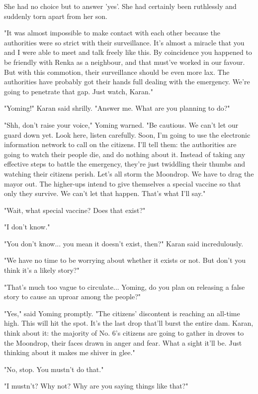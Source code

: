 She had no choice but to answer 'yes'. She had certainly been ruthlessly
and suddenly torn apart from her son.

"It was almost impossible to make contact with each other because the
authorities were so strict with their surveillance. It's almost a
miracle that you and I were able to meet and talk freely like this. By
coincidence you happened to be friendly with Renka as a neighbour, and
that must've worked in our favour. But with this commotion, their
surveillance should be even more lax. The authorities have probably got
their hands full dealing with the emergency. We're going to penetrate
that gap. Just watch, Karan."

"Yoming!" Karan said shrilly. "Answer me. What are you planning to do?"

"Shh, don't raise your voice," Yoming warned. "Be cautious. We can't let
our guard down yet. Look here, listen carefully. Soon, I'm going to use
the electronic information network to call on the citizens. I'll tell
them: the authorities are going to watch their people die, and do
nothing about it. Instead of taking any effective steps to battle the
emergency, they're just twiddling their thumbs and watching their
citizens perish. Let's all storm the Moondrop. We have to drag the mayor
out. The higher-ups intend to give themselves a special vaccine so that
only they survive. We can't let that happen. That's what I'll say."

"Wait, what special vaccine? Does that exist?"

"I don't know."

"You don't know... you mean it doesn't exist, then?" Karan said
incredulously.

"We have no time to be worrying about whether it exists or not. But
don't you think it's a likely story?"

"That's much too vague to circulate... Yoming, do you plan on releasing
a false story to cause an uproar among the people?"

"Yes," said Yoming promptly. "The citizens' discontent is reaching an
all-time high. This will hit the spot. It's the last drop that'll burst
the entire dam. Karan, think about it: the majority of No. 6's citizens
are going to gather in droves to the Moondrop, their faces drawn in
anger and fear. What a sight it'll be. Just thinking about it makes me
shiver in glee."

"No, stop. You mustn't do that."

"I mustn't? Why not? Why are you saying things like that?"

